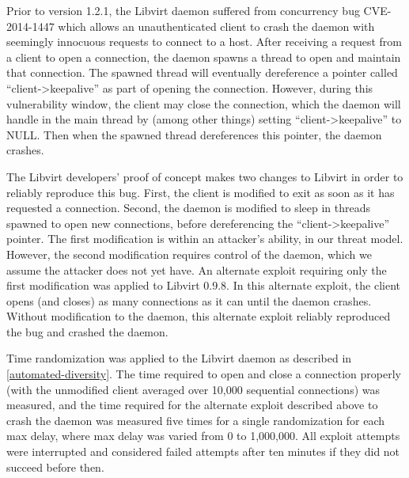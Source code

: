 Prior to version 1.2.1, the Libvirt daemon suffered from concurrency bug CVE-2014-1447 which allows an unauthenticated client to crash the daemon with seemingly innocuous requests to connect to a host.
After receiving a request from a client to open a connection, the daemon spawns a thread to open and maintain that connection.
The spawned thread will eventually dereference a pointer called
``client->keepalive'' as part of opening the connection.
However, during this vulnerability window, the client may close the
connection, which the daemon will handle in the main thread by (among other
things) setting ``client->keepalive'' to NULL.
Then when the spawned thread dereferences this pointer, the daemon crashes. \cite{RHELbug1047577}

The Libvirt developers' proof of concept makes two changes to Libvirt in order to reliably reproduce this bug.
First, the client is modified to exit as soon as it has requested a connection.
Second, the daemon is modified to sleep in threads spawned to open new
connections, before dereferencing the ``client->keepalive'' pointer.
The first modification is within an attacker's ability, in our threat model.
However, the second modification requires control of the daemon, which we assume the attacker does not yet have.
An alternate exploit requiring only the first modification was applied to Libvirt 0.9.8.
In this alternate exploit, the client opens (and closes) as many connections as it can until the daemon crashes.
Without modification to the daemon, this alternate exploit reliably reproduced the bug and crashed the daemon.

Time randomization was applied to the Libvirt daemon as described in \autoref{automated-diversity}.
The time required to open and close a connection properly (with the unmodified client averaged over 10,000 sequential connections) was measured, and the time required for the alternate exploit described above to crash the daemon was measured five times for a single randomization for each max delay, where max delay was varied from 0 to 1,000,000.
All exploit attempts were interrupted and considered failed attempts after ten minutes if they did not succeed before then.
